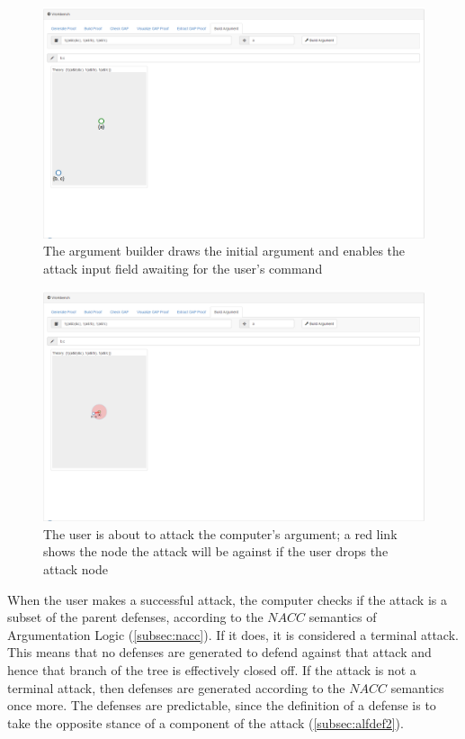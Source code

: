 \documentclass[11pt,twoside,a4paper]{report}
\begin{document}
\begin{figure}[htp]
\centerline{\includegraphics[scale=0.3]{img/scr-client-argttack.png}}
\caption{The argument builder draws the initial argument and enables the attack input field awaiting for the user's command\label{fig:scrclientargttack}}
\end{figure}

\begin{figure}[htp]
\centerline{\includegraphics[scale=0.3]{img/scr-client-finishhim.png}}
\caption{The user is about to attack the computer's argument; a red link shows the node the attack will be against if the user drops the attack node\label{fig:scrclientfinishhim}}
\end{figure}

When the user makes a successful attack, the computer checks if the attack is a subset of the parent defenses, according to the $NACC$ semantics of Argumentation Logic (\autoref{subsec:nacc}). If it does, it is considered a terminal attack. This means that no defenses are generated to defend against that attack and hence that branch of the tree is effectively closed off. If the attack is not a terminal attack, then defenses are generated according to the $NACC$ semantics once more. The defenses are predictable, since the definition of a defense is to take the opposite stance of a component of the attack (\autoref{subsec:alfdef2}).
\end{document}
